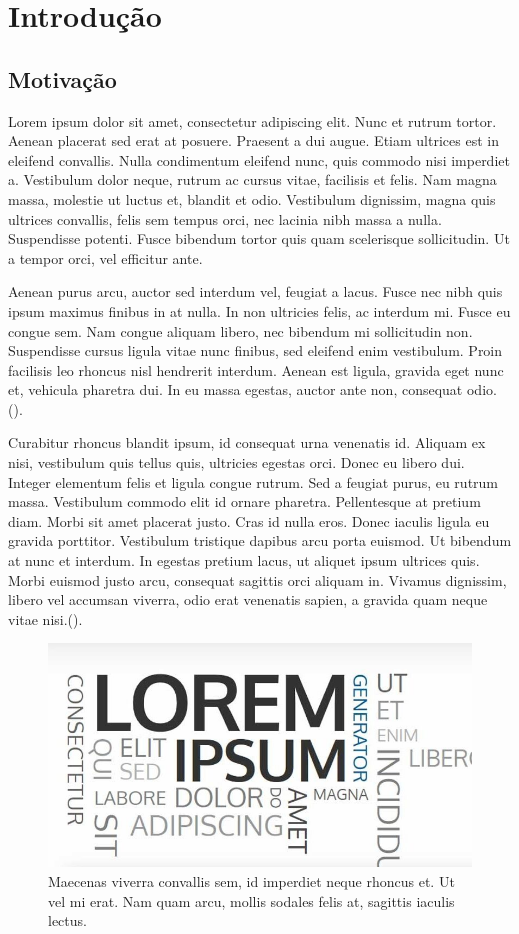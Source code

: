 \chapter{Introdução}

\section{Motivação}

Lorem ipsum dolor sit amet, consectetur adipiscing elit. Nunc et rutrum tortor. Aenean placerat sed erat at posuere. Praesent a dui augue. Etiam ultrices est in eleifend convallis. Nulla condimentum eleifend nunc, quis commodo nisi imperdiet a. Vestibulum dolor neque, rutrum ac cursus vitae, facilisis et felis. Nam magna massa, molestie ut luctus et, blandit et odio. Vestibulum dignissim, magna quis ultrices convallis, felis sem tempus orci, nec lacinia nibh massa a nulla. Suspendisse potenti. Fusce bibendum tortor quis quam scelerisque sollicitudin. Ut a tempor orci, vel efficitur ante.

Aenean purus arcu, auctor sed interdum vel, feugiat a lacus. Fusce nec nibh quis ipsum maximus finibus in at nulla. In non ultricies felis, ac interdum mi. Fusce eu congue sem. Nam congue aliquam libero, nec bibendum mi sollicitudin non. Suspendisse cursus ligula vitae nunc finibus, sed eleifend enim vestibulum. Proin facilisis leo rhoncus nisl hendrerit interdum. Aenean est ligula, gravida eget nunc et, vehicula pharetra dui. In eu massa egestas, auctor ante non, consequat odio. (\cite{alvim2007}).

Curabitur rhoncus blandit ipsum, id consequat urna venenatis id. Aliquam ex nisi, vestibulum quis tellus quis, ultricies egestas orci. Donec eu libero dui. Integer elementum felis et ligula congue rutrum. Sed a feugiat purus, eu rutrum massa. Vestibulum commodo elit id ornare pharetra. Pellentesque at pretium diam. Morbi sit amet placerat justo. Cras id nulla eros. Donec iaculis ligula eu gravida porttitor. Vestibulum tristique dapibus arcu porta euismod. Ut bibendum at nunc et interdum. In egestas pretium lacus, ut aliquet ipsum ultrices quis. Morbi euismod justo arcu, consequat sagittis orci aliquam in. Vivamus dignissim, libero vel accumsan viverra, odio erat venenatis sapien, a gravida quam neque vitae nisi.(\cite{mme2020}). 

\begin{figure}[H]
    \centering
    \includegraphics[width=0.5\linewidth]{Imagens/chap01/loren-ipsum-cover.jpg}
    \caption{Maecenas viverra convallis sem, id imperdiet neque rhoncus et. Ut vel mi erat. Nam quam arcu, mollis sodales felis at, sagittis iaculis lectus.}
    \label{fig:lorem_ipsum}
\end{figure}

